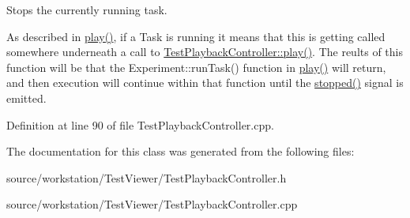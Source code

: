 Stops the currently running task. 

As described in \hyperlink{class_test_playback_controller_a169259eb2f0c71d173efdf1b3f00bef3}{play()}, if a Task is running it means that this is getting called somewhere underneath a call to \hyperlink{class_test_playback_controller_a169259eb2f0c71d173efdf1b3f00bef3}{Test\-Playback\-Controller\-::play()}. The reults of this function will be that the Experiment\-::run\-Task() function in \hyperlink{class_test_playback_controller_a169259eb2f0c71d173efdf1b3f00bef3}{play()} will return, and then execution will continue within that function until the \hyperlink{class_test_playback_controller_a3ff862f1e1ff73faa49fdab265645625}{stopped()} signal is emitted. 

Definition at line 90 of file Test\-Playback\-Controller.\-cpp.



The documentation for this class was generated from the following files\-:\begin{DoxyCompactItemize}
\item 
source/workstation/\-Test\-Viewer/Test\-Playback\-Controller.\-h\item 
source/workstation/\-Test\-Viewer/Test\-Playback\-Controller.\-cpp\end{DoxyCompactItemize}
